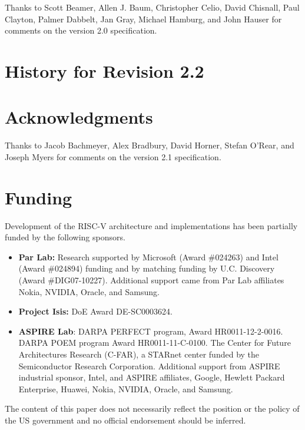 Thanks to Scott Beamer, Allen J. Baum, Christopher Celio, David Chisnall,
Paul Clayton, Palmer Dabbelt, Jan Gray, Michael Hamburg, and John
Hauser for comments on the version 2.0 specification.

\section{History for Revision 2.2}


\section*{Acknowledgments}

Thanks to Jacob Bachmeyer, Alex Bradbury, David Horner, Stefan O'Rear,
and Joseph Myers for comments on the version 2.1 specification.

\section{Funding}

Development of the RISC-V architecture and implementations has been
partially funded by the following sponsors.
\begin{itemize}

\item {\bf Par Lab:} Research supported by Microsoft (Award \#024263) and Intel (Award
    \#024894) funding and by matching funding by U.C. Discovery
    (Award \#DIG07-10227). Additional support came from Par Lab
    affiliates Nokia, NVIDIA, Oracle, and Samsung.

\item {\bf Project Isis:} DoE Award DE-SC0003624.

\item {\bf ASPIRE Lab}: DARPA PERFECT program, Award
    HR0011-12-2-0016.  DARPA POEM program Award HR0011-11-C-0100.  The
    Center for Future Architectures Research (C-FAR), a STARnet center
    funded by the Semiconductor Research Corporation.  Additional
    support from ASPIRE industrial sponsor, Intel, and ASPIRE
    affiliates, Google, Hewlett Packard Enterprise, Huawei, Nokia,
    NVIDIA, Oracle, and Samsung.

\end{itemize}

The content of this paper does not necessarily reflect the position or the
policy of the US government and no official endorsement should be
inferred. 
